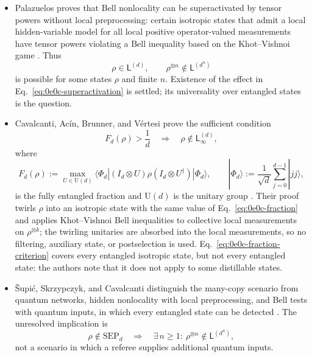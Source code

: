 \begin{itemize}
  \item Palazuelos proves that Bell nonlocality can be superactivated by tensor
  powers without local preprocessing: certain isotropic states that admit a
  local hidden-variable model for all local positive operator-valued
  measurements have tensor powers violating a Bell inequality based on the
  Khot--Vishnoi game .  Thus
  \begin{equation}
    \rho\in\mathsf L^{(d)},
    \qquad
    \rho^{\otimes n}\notin\mathsf L^{(d^n)}
    \label{eq:0e0c-superactivation}
  \end{equation}
  is possible for some states $\rho$ and finite $n$.  Existence of the effect
  in Eq.~\eqref{eq:0e0c-superactivation} is settled; its universality over
  entangled states is the question.

  \item Cavalcanti, Ac\'in, Brunner, and V\'ertesi prove the sufficient condition
  \begin{equation}
    F_d(\rho)>\frac1d
    \quad\Longrightarrow\quad
    \rho\notin\mathsf L_\infty^{(d)},
    \label{eq:0e0c-fraction-criterion}
  \end{equation}
  where
  \begin{equation}
    F_d(\rho):=\max_{U\in\mathrm U(d)}
    \langle\Phi_d|(I_d\otimes U)\rho(I_d\otimes U^\dagger)|\Phi_d\rangle,
    \qquad
    |\Phi_d\rangle:=\frac1{\sqrt d}\sum_{j=0}^{d-1}|jj\rangle,
    \label{eq:0e0c-fraction}
  \end{equation}
  is the fully entangled fraction and $\mathrm U(d)$ is the unitary group
  .  Their proof twirls $\rho$ into an
  isotropic state with the same value of Eq.~\eqref{eq:0e0c-fraction} and
  applies Khot--Vishnoi Bell inequalities to collective local measurements on
  $\rho^{\otimes k}$; the twirling unitaries are absorbed into the local
  measurements, so no filtering, auxiliary state, or postselection is used.
  Eq.~\eqref{eq:0e0c-fraction-criterion} covers every entangled isotropic
  state, but not every entangled state: the authors note that it does not
  apply to some distillable states.

  \item \v{S}upi\'c, Skrzypczyk, and Cavalcanti distinguish the many-copy scenario
  from quantum networks, hidden nonlocality with local preprocessing, and
  Bell tests with quantum inputs, in which every entangled state can be
  detected .  The unresolved implication is
  \begin{equation}
    \rho\notin\mathrm{SEP}_d
    \quad\Longrightarrow\quad
    \exists\,n\geq1:\ \rho^{\otimes n}\notin\mathsf L^{(d^n)},
    \label{eq:0e0c-implication}
  \end{equation}
  not a scenario in which a referee supplies additional quantum inputs.


\end{itemize}
